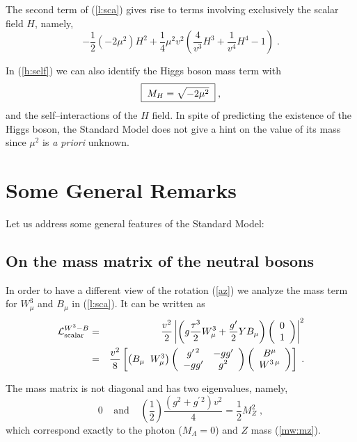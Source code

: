 \documentclass[12pt]{report}
\def\text#1{{\scriptstyle\mathrm{#1}}}
\newcommand{\lag}{{\cal L}}
\newcommand{\ba}{\begin{array}}
\newcommand{\ea}{\end{array}}
\begin{document}
The second term of (\ref{l:sca}) gives rise to terms involving
exclusively the scalar field $H$, namely,
\begin{equation}
-\frac{1}{2} (- 2 \mu^2) H^2 + \frac{1}{4} \mu^2 v^2
\left(\frac{4}{v^3} H^3 + \frac{1}{v^4} H^4 - 1 \right) \; .
\label{h:self}
\end{equation}

In (\ref{h:self}) we can also identify the Higgs boson mass term with
\begin{equation}
\fbox{$  \; \displaystyle{M_H = \sqrt{- 2 \mu^2}} \; $} \; ,
\label{mh}
\end{equation}
and the self--interactions of the $H$ field. In spite of predicting
the existence of the Higgs boson, the Standard Model does not give a
hint on the value of its mass since $\mu^2$ is {\it a priori}
unknown.


\section{Some General Remarks} \label{remarks} \indent

Let us  address some general features of the Standard Model:

\subsection{On the mass matrix of the neutral bosons} \indent

In order to have a different view of the rotation (\ref{az}) we
analyze the mass term for $W^3_\mu$ and $B_\mu$ in (\ref{l:sca}).
It can be written as
\begin{eqnarray*}
\lag^{W^3-B}_{\text{scalar}} &=& \frac{v^2}{2} \left|
\left(g \frac{\tau^3}{2} W^3_\mu + \frac{g'}{2} Y B_\mu 
\right)	\left( \ba{c}
	           0\\
	           1
              \ea \right)  \right|^2 
\\
&=& \frac{v^2}{8} \left[ 
\left( B_\mu  \;\; W^3_\mu \right)
			\left( \ba{cc}
	      		g^{\prime \, 2}	& - g g^\prime \\
	          	- g g^\prime 	&  g^2
              		\ea \right)	
\left( \ba{c}
B^\mu \\
W^{3 \, \mu}
\ea \right) \right] \; . 
\end{eqnarray*}

The mass matrix is not diagonal and has two eigenvalues, namely, 
\[
{ 0} \;\;\;\;  \mbox{and} \;\;\;\;
{ \left(\frac{1}{2}\right) 
\frac{(g^2  + g^{\prime \, 2})v^2}{4} =
\frac{1}{2} M_Z^2 } \; ,
\]
which correspond exactly to the photon ($M_A =0$) and $Z$ mass
(\ref{mw:mz}). 
\end{document}
